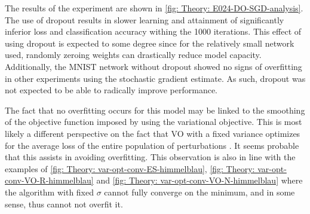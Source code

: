 The results of the experiment are shown in \autoref{fig: Theory: E024-DO-SGD-analysis}. The use of dropout results in slower learning and attainment of significantly inferior loss and classification accuracy withing the 1000 iterations. This effect of using dropout is expected to some degree since for the relatively small network used, randomly zeroing weights can drastically reduce model capacity.
Additionally, the \gls{MNIST} network without dropout showed no signs of overfitting in other experiments using the stochastic gradient estimate. As such, dropout was not expected to be able to radically improve performance. 

The fact that no overfitting occurs for this model may be linked to the smoothing of the objective function imposed by using the variational objective. This is most likely a different perspective on the fact that \gls{VO} with a fixed variance optimizes for the average loss of the entire population of perturbations \cite{Lehman2017}. It seems probable that this assists in avoiding overfitting. This observation is also in line with the examples of \autoref{fig: Theory: var-opt-conv-ES-himmelblau}, \ref{fig: Theory: var-opt-conv-VO-R-himmelblau} and \ref{fig: Theory: var-opt-conv-VO-N-himmelblau} where the algorithm with fixed $\sigma$ cannot fully converge on the minimum, and in some sense, thus cannot not overfit it.

